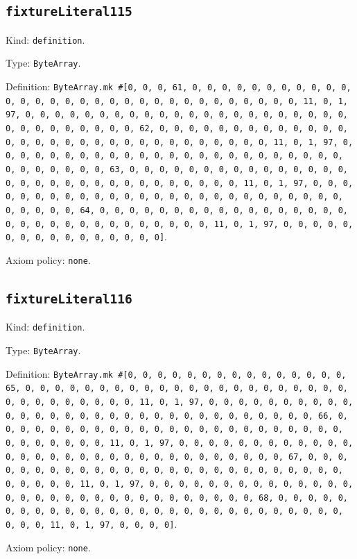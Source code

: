 \documentclass[11pt]{article}
\begin{document}
\subsection*{\texttt{fixtureLiteral115}}
\noindent Kind: \texttt{definition}.\par
\noindent Type: \texttt{ByteArray}.\par
\noindent Definition: \texttt{ByteArray.mk \#[0, 0, 0, 61, 0, 0, 0, 0, 0, 0, 0, 0, 0, 0, 0, 0, 0, 0, 0, 0, 0, 0, 0, 0, 0, 0, 0, 0, 0, 0, 0, 0, 0, 0, 0, 11, 0, 1, 97, 0, 0, 0, 0, 0, 0, 0, 0, 0, 0, 0, 0, 0, 0, 0, 0, 0, 0, 0, 0, 0, 0, 0, 0, 0, 0, 0, 0, 0, 0, 0, 62, 0, 0, 0, 0, 0, 0, 0, 0, 0, 0, 0, 0, 0, 0, 0, 0, 0, 0, 0, 0, 0, 0, 0, 0, 0, 0, 0, 0, 0, 0, 0, 11, 0, 1, 97, 0, 0, 0, 0, 0, 0, 0, 0, 0, 0, 0, 0, 0, 0, 0, 0, 0, 0, 0, 0, 0, 0, 0, 0, 0, 0, 0, 0, 0, 0, 0, 63, 0, 0, 0, 0, 0, 0, 0, 0, 0, 0, 0, 0, 0, 0, 0, 0, 0, 0, 0, 0, 0, 0, 0, 0, 0, 0, 0, 0, 0, 0, 0, 11, 0, 1, 97, 0, 0, 0, 0, 0, 0, 0, 0, 0, 0, 0, 0, 0, 0, 0, 0, 0, 0, 0, 0, 0, 0, 0, 0, 0, 0, 0, 0, 0, 0, 0, 64, 0, 0, 0, 0, 0, 0, 0, 0, 0, 0, 0, 0, 0, 0, 0, 0, 0, 0, 0, 0, 0, 0, 0, 0, 0, 0, 0, 0, 0, 0, 0, 11, 0, 1, 97, 0, 0, 0, 0, 0, 0, 0, 0, 0, 0, 0, 0, 0, 0, 0, 0]}.\par
\noindent Axiom policy: \texttt{none}.\par
\subsection*{\texttt{fixtureLiteral116}}
\noindent Kind: \texttt{definition}.\par
\noindent Type: \texttt{ByteArray}.\par
\noindent Definition: \texttt{ByteArray.mk \#[0, 0, 0, 0, 0, 0, 0, 0, 0, 0, 0, 0, 0, 0, 0, 65, 0, 0, 0, 0, 0, 0, 0, 0, 0, 0, 0, 0, 0, 0, 0, 0, 0, 0, 0, 0, 0, 0, 0, 0, 0, 0, 0, 0, 0, 0, 0, 11, 0, 1, 97, 0, 0, 0, 0, 0, 0, 0, 0, 0, 0, 0, 0, 0, 0, 0, 0, 0, 0, 0, 0, 0, 0, 0, 0, 0, 0, 0, 0, 0, 0, 0, 66, 0, 0, 0, 0, 0, 0, 0, 0, 0, 0, 0, 0, 0, 0, 0, 0, 0, 0, 0, 0, 0, 0, 0, 0, 0, 0, 0, 0, 0, 0, 0, 11, 0, 1, 97, 0, 0, 0, 0, 0, 0, 0, 0, 0, 0, 0, 0, 0, 0, 0, 0, 0, 0, 0, 0, 0, 0, 0, 0, 0, 0, 0, 0, 0, 0, 0, 67, 0, 0, 0, 0, 0, 0, 0, 0, 0, 0, 0, 0, 0, 0, 0, 0, 0, 0, 0, 0, 0, 0, 0, 0, 0, 0, 0, 0, 0, 0, 0, 11, 0, 1, 97, 0, 0, 0, 0, 0, 0, 0, 0, 0, 0, 0, 0, 0, 0, 0, 0, 0, 0, 0, 0, 0, 0, 0, 0, 0, 0, 0, 0, 0, 0, 0, 68, 0, 0, 0, 0, 0, 0, 0, 0, 0, 0, 0, 0, 0, 0, 0, 0, 0, 0, 0, 0, 0, 0, 0, 0, 0, 0, 0, 0, 0, 0, 0, 11, 0, 1, 97, 0, 0, 0, 0]}.\par
\noindent Axiom policy: \texttt{none}.\par
\end{document}

